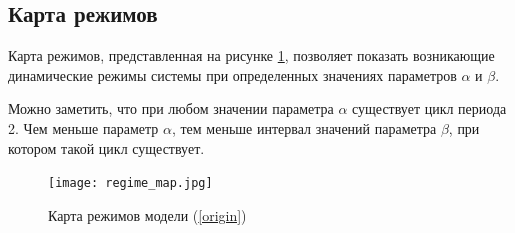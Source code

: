     \subsection{Карта режимов}

        Карта режимов, представленная на рисунке \ref{regimeMap}, позволяет показать возникающие динамические режимы системы при определенных значениях параметров \(\alpha\) и \(\beta\).

        Можно заметить, что при любом значении параметра \(\alpha\) существует цикл периода  2. Чем меньше параметр \(\alpha\), тем меньше интервал значений параметра \(\beta\), при котором такой цикл существует.

        \begin{figure}
            \centering
            \texttt{[image: regime\_map.jpg]}

            \captionsetup{justification=centering}
            \caption{Карта режимов модели (\ref{origin})}
            \label{regimeMap}
        \end{figure}
